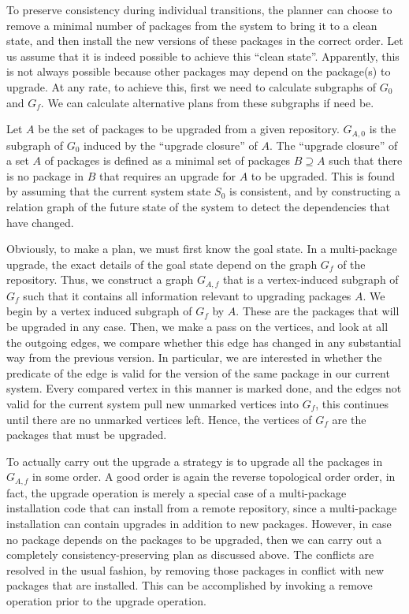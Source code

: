 \documentclass[a4paper,11pt]{article}
\begin{document}
To preserve consistency during individual transitions, the planner can
choose to remove a minimal number of packages from the system to bring
it to a clean state, and then install the new versions of these
packages in the correct order. Let us assume that it is indeed
possible to achieve this ``clean state''. Apparently, this is not
always possible because other packages may depend on the package(s) to
upgrade. At any rate, to achieve this, first we need to
calculate subgraphs of $G_0$ and $G_f$. We can calculate alternative
plans from these subgraphs if need be.

Let $A$ be the set of packages to be upgraded from a given repository.
$G_{A,0}$ is the subgraph of $G_{0}$ induced by the ``upgrade
closure'' of $A$. The ``upgrade closure'' of a set $A$ of packages is
defined as a minimal set of packages $B \supseteq A$ such that there is no
package in $B$ that requires an upgrade for $A$ to be upgraded. This
is found by assuming that the current system state $S_0$ is
consistent, and by constructing a relation graph of the future state
of the system to detect the dependencies that have changed.

Obviously, to make a plan, we must first know the goal state. In a
multi-package upgrade, the exact details of the goal state depend on
the graph $G_f$ of the repository. Thus, we construct a graph
$G_{A,f}$ that is a vertex-induced subgraph of $G_f$ such that it
contains all information relevant to upgrading packages $A$. We begin
by a vertex induced subgraph of $G_f$ by $A$. These are the packages
that will be upgraded in any case. Then, we make a pass on the
vertices, and look at all the outgoing edges, we compare whether this
edge has changed in any substantial way from the previous version. In
particular, we are interested in whether the predicate of the edge is
valid for the version of the same package in our current system. Every
compared vertex in this manner is marked done, and the edges not valid
for the current system pull new unmarked vertices into $G_f$, this
continues until there are no unmarked vertices left. Hence, the
vertices of $G_f$ are the packages that must be upgraded.

To actually carry out the upgrade a strategy is to upgrade all the
packages in $G_{A,f}$ in some order. A good order is again the reverse
topological order order, in fact, the upgrade operation is merely a
special case of a multi-package installation code that can install
from a remote repository, since a multi-package installation can
contain upgrades in addition to new packages. However, in case no
package depends on the packages to be upgraded, then we can carry out
a completely consistency-preserving plan as discussed above. The
conflicts are resolved in the usual fashion, by removing those
packages in conflict with new packages that are installed. This can be
accomplished by invoking a remove operation prior to the upgrade
operation.
\end{document}
